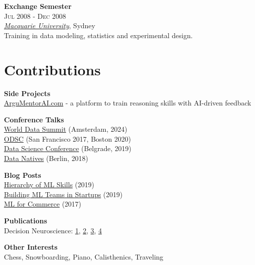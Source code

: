 \documentclass[a4paper,9.5pt]{article}
\begin{document}
\begin{minipage}[t]{0.32\textwidth}
\textbf{Exchange Semester}\\
\textsc{Jul 2008 - Dec 2008}\\
\textit{\href{https://www.mq.edu.au/}{Macquarie University}}, Sydney\\
Training in data modeling, statistics and experimental design.
\vspace{4mm}

\section{Contributions}
\small
\vspace{1.5mm}
\textbf{Side Projects}\\
\href{https://argumentorai.com}{ArguMentorAI.com} - a platform to train reasoning skills with AI-driven feedback
\vspace{2mm}

\textbf{Conference Talks}\\
\href{https://worlddatasummit.com/}{World Data Summit} (Amsterdam, 2024)\\
\href{https://odsc.com}{ODSC} (San Francisco 2017, Boston 2020)\\
\href{https://www.datasciconference.com/}{Data Science Conference} (Belgrade, 2019)\\
\href{https://datanatives.io}{Data Natives} (Berlin, 2018)
\vspace{2mm}

\textbf{Blog Posts}\\
\href{https://medium.com/data-science/what-separates-good-from-great-data-scientists-2906431455fd}{Hierarchy of ML Skills} (2019)\\
\href{https://techblog.commercetools.com/building-up-a-data-science-team-from-scratch-7a7b24ba9f2d}{Building ML Teams in Startups} (2019)\\
\href{https://techblog.commercetools.com/top-5-machine-learning-applications-for-e-commerce-268eb1c89607}{ML for Commerce} (2017)
\vspace{2mm}

\textbf{Publications}\\
Decision Neuroscience: \href{https://doi.org/10.1093/scan/nsab125}{1}, \href{ https://doi.org/10.1111/acer.14812}{2}, \href{https://doi.org/10.1093/scan/nst110}{3}, \href{https://doi.org/10.1093/scan/nsw036}{4}
\vspace{2mm}


\textbf{Other Interests}\\
Chess, Snowboarding, Piano, Calisthenics, Traveling

\end{minipage}
\end{document}
